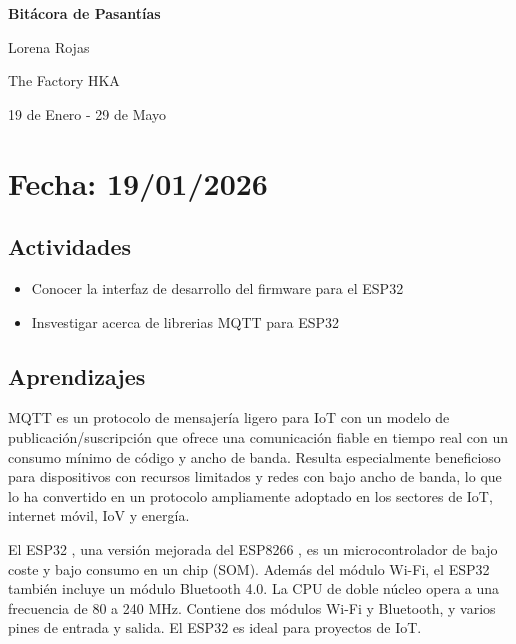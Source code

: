 \documentclass[12pt, a4paper]{article}
\begin{document}
    \begin{center}
        {\Huge \textcolor{azul}{\textbf{Bitácora de Pasantías}}}

        \vspace{0.5cm}

        {\Large Lorena Rojas}

        {\large The Factory HKA}

        \vspace{1cm}

        {\large 19 de Enero - 29 de Mayo}
    \end{center}

    \section*{Fecha: 19/01/2026}

    \subsection*{Actividades}

    \begin{itemize}
        \item Conocer la interfaz de desarrollo del firmware para el ESP32
        \item Insvestigar acerca de librerias MQTT para ESP32
    \end{itemize}

    \subsection*{Aprendizajes}

    MQTT es un protocolo de mensajería ligero para IoT con un modelo de publicación/suscripción que ofrece una comunicación fiable en tiempo real con un consumo mínimo de código y ancho de banda. Resulta especialmente beneficioso para dispositivos con recursos limitados y redes con bajo ancho de banda, lo que lo ha convertido en un protocolo ampliamente adoptado en los sectores de IoT, internet móvil, IoV y energía.

    El ESP32 , una versión mejorada del ESP8266 , es un microcontrolador de bajo coste y bajo consumo en un chip (SOM). Además del módulo Wi-Fi, el ESP32 también incluye un módulo Bluetooth 4.0. La CPU de doble núcleo opera a una frecuencia de 80 a 240 MHz. Contiene dos módulos Wi-Fi y Bluetooth, y varios pines de entrada y salida. El ESP32 es ideal para proyectos de IoT.
\end{document}
